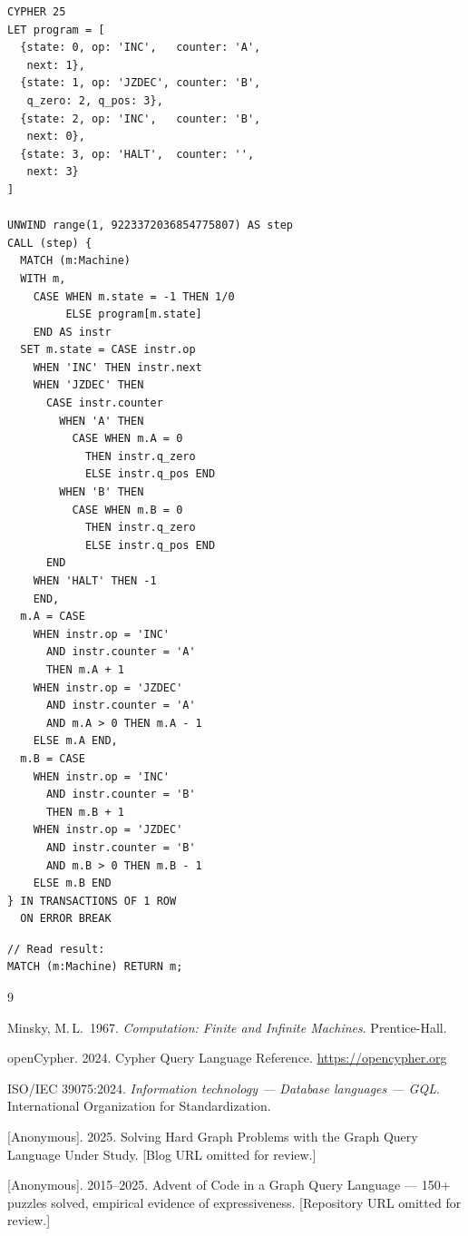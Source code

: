 \documentclass[sigconf, anonymous, review, nonacm]{acmart}
\begin{document}
\vspace{-0.5em}

\begin{codeblock}
\begin{lstlisting}[style=cypher]
CYPHER 25
LET program = [
  {state: 0, op: 'INC',   counter: 'A',
   next: 1},
  {state: 1, op: 'JZDEC', counter: 'B',
   q_zero: 2, q_pos: 3},
  {state: 2, op: 'INC',   counter: 'B',
   next: 0},
  {state: 3, op: 'HALT',  counter: '',
   next: 3}
]

UNWIND range(1, 9223372036854775807) AS step
CALL (step) {
  MATCH (m:Machine)
  WITH m,
    CASE WHEN m.state = -1 THEN 1/0
         ELSE program[m.state]
    END AS instr
  SET m.state = CASE instr.op
    WHEN 'INC' THEN instr.next
    WHEN 'JZDEC' THEN
      CASE instr.counter
        WHEN 'A' THEN
          CASE WHEN m.A = 0
            THEN instr.q_zero
            ELSE instr.q_pos END
        WHEN 'B' THEN
          CASE WHEN m.B = 0
            THEN instr.q_zero
            ELSE instr.q_pos END
      END
    WHEN 'HALT' THEN -1
    END,
  m.A = CASE
    WHEN instr.op = 'INC'
      AND instr.counter = 'A'
      THEN m.A + 1
    WHEN instr.op = 'JZDEC'
      AND instr.counter = 'A'
      AND m.A > 0 THEN m.A - 1
    ELSE m.A END,
  m.B = CASE
    WHEN instr.op = 'INC'
      AND instr.counter = 'B'
      THEN m.B + 1
    WHEN instr.op = 'JZDEC'
      AND instr.counter = 'B'
      AND m.B > 0 THEN m.B - 1
    ELSE m.B END
} IN TRANSACTIONS OF 1 ROW
  ON ERROR BREAK
\end{lstlisting}
\end{codeblock}

\begin{codeblock}
\begin{lstlisting}[style=cypher]
// Read result:
MATCH (m:Machine) RETURN m;
\end{lstlisting}
\end{codeblock}


\begin{thebibliography}{9}

Minsky, M.\,L.\ 1967.
\emph{Computation: Finite and Infinite Machines}.
Prentice-Hall.

openCypher. 2024.
Cypher Query Language Reference.
\url{https://opencypher.org}

ISO/IEC 39075:2024.
\emph{Information technology --- Database languages --- GQL}.
International Organization for Standardization.

[Anonymous]. 2025.
Solving Hard Graph Problems with the Graph Query Language Under Study.
[Blog URL omitted for review.]

[Anonymous]. 2015--2025.
Advent of Code in a Graph Query Language ---
150+ puzzles solved, empirical evidence of expressiveness.
[Repository URL omitted for review.]

\end{thebibliography}
\end{document}
